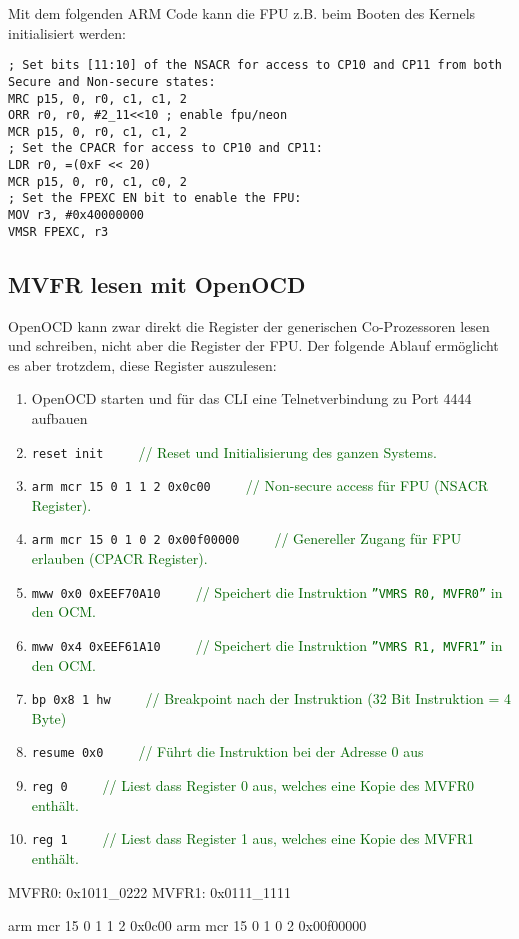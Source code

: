 Mit dem folgenden ARM Code kann die FPU z.B. beim Booten des Kernels initialisiert werden:

\lstset{language=[x86masm]Assembler}
\begin{lstlisting}[frame=single]
; Set bits [11:10] of the NSACR for access to CP10 and CP11 from both Secure and Non-secure states:
MRC p15, 0, r0, c1, c1, 2
ORR r0, r0, #2_11<<10 ; enable fpu/neon
MCR p15, 0, r0, c1, c1, 2
; Set the CPACR for access to CP10 and CP11:
LDR r0, =(0xF << 20)
MCR p15, 0, r0, c1, c0, 2
; Set the FPEXC EN bit to enable the FPU:
MOV r3, #0x40000000
VMSR FPEXC, r3
\end{lstlisting}


\subsection{MVFR lesen mit OpenOCD}
OpenOCD kann zwar direkt die Register der generischen Co-Prozessoren lesen und schreiben, nicht aber die Register der FPU.
Der folgende Ablauf ermöglicht es aber trotzdem, diese Register auszulesen:

\begin{enumerate}
\item OpenOCD starten und für das CLI eine Telnetverbindung zu Port 4444 aufbauen
\item \texttt{reset init}\ \ \ \ \ \textcolor{darkgreen}{// Reset und Initialisierung des ganzen Systems.} 
\item \texttt{arm mcr 15 0 1 1 2 0x0c00}\ \ \ \ \ \textcolor{darkgreen}{// Non-secure access für FPU (NSACR Register).} 
\item \texttt{arm mcr 15 0 1 0 2 0x00f00000}\ \ \ \ \ \textcolor{darkgreen}{// Genereller Zugang für FPU erlauben (CPACR Register).} 
\item \texttt{mww 0x0 0xEEF70A10}\ \ \ \ \ \textcolor{darkgreen}{// Speichert die Instruktion \texttt{''VMRS R0, MVFR0''} in den OCM.}
\item \texttt{mww 0x4 0xEEF61A10}\ \ \ \ \ \textcolor{darkgreen}{// Speichert die Instruktion \texttt{''VMRS R1, MVFR1''} in den OCM.}
\item \texttt{bp 0x8 1 hw}\ \ \ \ \ \textcolor{darkgreen}{// Breakpoint nach der Instruktion (32 Bit Instruktion = 4 Byte)}
\item \texttt{resume 0x0}\ \ \ \ \ \textcolor{darkgreen}{// Führt die Instruktion bei der Adresse 0 aus}
\item \texttt{reg 0}\ \ \ \ \ \textcolor{darkgreen}{// Liest dass Register 0 aus, welches eine Kopie des MVFR0 enthält.}
\item \texttt{reg 1}\ \ \ \ \ \textcolor{darkgreen}{// Liest dass Register 1 aus, welches eine Kopie des MVFR1 enthält.}
\end{enumerate}


MVFR0:	0x1011\_0222
MVFR1:	0x0111\_1111


	arm mcr 15 0 1 1 2 0x0c00
	arm mcr 15 0 1 0 2 0x00f00000